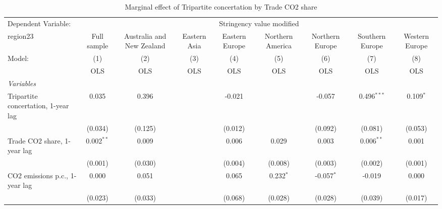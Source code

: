 
\begin{table}[htbp]
   \caption{Marginal effect of Tripartite concertation by Trade CO2 share}
   \centering
   \begin{tabular}{lcccccccc}
      \toprule
      Dependent Variable: & \multicolumn{8}{c}{Stringency value modified}\\
      region23                                                          & Full sample    & Australia and New Zealand & Eastern Asia & Eastern Europe & Northern America & Northern Europe & Southern Europe & Western Europe \\   
      Model:                                                            & (1)            & (2)                       & (3)          & (4)            & (5)              & (6)             & (7)             & (8)\\  
                                                                        &  OLS           & OLS                       & OLS          & OLS            & OLS              & OLS             & OLS             & OLS\\  
      \midrule
      \emph{Variables}\\
      Tripartite concertation, 1-year lag                               & 0.035          & 0.396                     &              & -0.021         &                  & -0.057          & 0.496$^{***}$   & 0.109$^{*}$\\   
                                                                        & (0.034)        & (0.125)                   &              & (0.012)        &                  & (0.092)         & (0.081)         & (0.053)\\   
      Trade CO2 share, 1-year lag                                       & 0.002$^{**}$   & 0.009                     &              & 0.006          & 0.029            & 0.003           & 0.006$^{**}$    & 0.001\\   
                                                                        & (0.001)        & (0.030)                   &              & (0.004)        & (0.008)          & (0.003)         & (0.002)         & (0.001)\\   
      CO2 emissions p.c., 1-year lag                                    & 0.000          & 0.051                     &              & 0.065          & 0.232$^{*}$      & -0.057$^{*}$    & -0.019          & 0.000\\   
                                                                        & (0.023)        & (0.033)                   &              & (0.068)        & (0.028)          & (0.028)         & (0.039)         & (0.017)\\   

\end{tabular}
\end{table}
